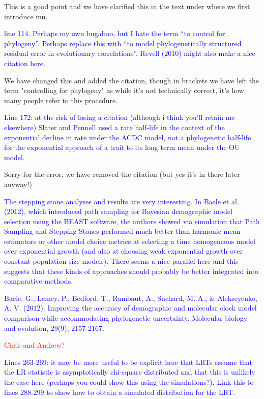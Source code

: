 \documentclass[12pt]{letter}
\begin{document}
\begin{letter}{}
This is a good point and we have clarified this in the text under where we first introduce mu. 

\textcolor{blue}{line 114. Perhaps my own bugaboo, but I hate the term “to control for phylogeny”. Perhaps replace this with “to model phylogenetically structured residual error in evolutionary correlations”. Revell (2010) might also make a nice citation here.}

We have changed this and added the citation, though in brackets we have left the term "controlling for phylogeny"
 as while it's not technically correct, it's how many people refer to this procedure.

\textcolor{blue}{Line 172: at the risk of losing a citation (although i think you’ll retain me elsewhere) Slater and Pennell used a rate half-life in the context of the exponential decline in rate under the ACDC model, not a phylogenetic half-life for the exponential approach of a trait to its long term mean under the OU model.}

Sorry for the error, we have removed the citation (but yes it's in there later anyway!)

\textcolor{blue}{The stepping stone analyses and results are very interesting. In Baele et al. (2012), which introduced path sampling for Bayesian demographic model selection using the BEAST software, the authors showed via simulation that Path Sampling and Stepping Stones performed much better than harmonic mean estimators or other model choice metrics at selecting a time homogeneous model over exponential growth (and also at choosing weak exponential growth over constant population size models). There seems a nice parallel here and this suggests that these kinds of approaches should probably be better integrated into comparative methods.}

\textcolor{blue}{Baele, G., Lemey, P., Bedford, T., Rambaut, A., Suchard, M. A., \& Alekseyenko, A. V. (2012). Improving the accuracy of demographic and molecular clock model comparison while accommodating phylogenetic uncertainty. Molecular biology and evolution, 29(9), 2157-2167.}

\textcolor{red}{Chris and Andrew?}

\textcolor{blue}{Lines 263-269: it may be more useful to be explicit here that LRTs assume that the LR statistic is asymptotically chi-square distributed and that this is unlikely the case here (perhaps you could show this using the simulations?). Link this to lines 288-299 to show how to obtain a simulated distribution for the LRT.}


\end{letter}
\end{document}
